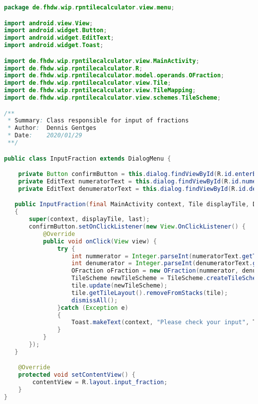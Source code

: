 \begin{lstlisting}[caption=InputFraction,label=list:InputFraction,language=Java]
package de.fhdw.wip.rpntilecalculator.view.menu;

import android.view.View;
import android.widget.Button;
import android.widget.EditText;
import android.widget.Toast;

import de.fhdw.wip.rpntilecalculator.view.MainActivity;
import de.fhdw.wip.rpntilecalculator.R;
import de.fhdw.wip.rpntilecalculator.model.operands.OFraction;
import de.fhdw.wip.rpntilecalculator.view.Tile;
import de.fhdw.wip.rpntilecalculator.view.TileMapping;
import de.fhdw.wip.rpntilecalculator.view.schemes.TileScheme;

/**
 * Summary: Class responsible for input of fractions
 * Author:  Dennis Gentges
 * Date:    2020/01/29
 **/

public class InputFraction extends DialogMenu {

    private Button confirmButton = this.dialog.findViewById(R.id.enterButton);
    private EditText numeratorText = this.dialog.findViewById(R.id.numerator);
    private EditText denumeratorText = this.dialog.findViewById(R.id.denumerator);

   public InputFraction(final MainActivity context, Tile displayTile, DialogMenu last)
   {
       super(context, displayTile, last);
       confirmButton.setOnClickListener(new View.OnClickListener() {
           @Override
           public void onClick(View view) {
               try {
                   int nummerator = Integer.parseInt(numeratorText.getText().toString());
                   int denumerator = Integer.parseInt(denumeratorText.getText().toString());
                   OFraction oFraction = new OFraction(nummerator, denumerator);
                   TileScheme newTileScheme = TileScheme.createTileScheme(TileMapping.O_FRACTION, oFraction, 0);
                   tile.update(newTileScheme);
                   tile.getTileLayout().removeFromStacks(tile);
                   dismissAll();
               }catch (Exception e)
               {
                   Toast.makeText(context, "Please check your input", Toast.LENGTH_SHORT).show();
               }
           }
       });
   }

    @Override
    protected void setContentView() {
        contentView = R.layout.input_fraction;
    }
}
\end{lstlisting}    

